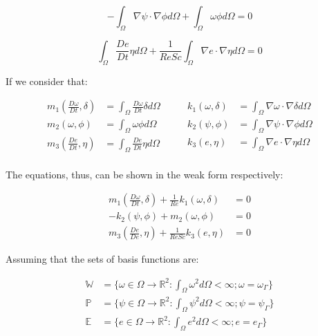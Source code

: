 \begin{equation} \label{stream weak}
 - \int_{\Omega} \nabla \psi \cdot \nabla \phi d\Omega
 + \int_{\Omega} \omega \phi d\Omega = 0
\end{equation}

\begin{equation} \label{concentration weak} 
   \int_{\Omega} \frac{D e}{Dt} \eta d\Omega
 + \frac{1}{\textit{ReSc}} \int_{\Omega} \nabla e \cdot \nabla \eta d\Omega 
 = 0
\end{equation}


\medskip
\noindent
If we consider that:

\begin{equation}
 \begin{aligned}
  \textbf{$m_1$}(\frac{D \omega}{Dt},\delta) & = \int_{\Omega} \frac{D \omega}{Dt} \delta d\Omega \\ 
  \textbf{$m_2$}(\omega,\phi) & = \int_{\Omega} \omega \phi d\Omega \\
  \textbf{$m_3$}(\frac{De}{Dt},\eta) & = \int_{\Omega} \frac{De}{Dt} \eta d\Omega \\
 \end{aligned}
 \qquad
 \begin{aligned}  
  \textbf{$k_1$}(\omega,\delta) & = \int_{\Omega} \nabla \omega \cdot \nabla \delta d\Omega \\
  \textbf{$k_2$}(\psi,\phi) & = \int_{\Omega} \nabla \psi \cdot \nabla \phi d\Omega \\
  \textbf{$k_3$}(e,\eta) & = \int_{\Omega} \nabla e \cdot \nabla \eta d\Omega \\
 \end{aligned}
\end{equation}

\noindent
The equations, thus, can be shown in the weak form respectively:

\begin{align}
 \textbf{$m_1$}(\frac{D \omega}{Dt},\delta) 
 + \frac{1}{\textit{Re}}\textbf{$k_1$}(\omega,\delta) 
 & = 0 \\
 - \textbf{$k_2$}(\psi,\phi) 
 + \textbf{$m_2$}(\omega,\phi) 
 & = 0 \\
 \textbf{$m_3$}(\frac{De}{De},\eta) 
 + \frac{1}{\textit{ReSc}}\textbf{$k_3$}(e,\eta) 
 & = 0
\end{align}


\noindent
Assuming that the sets of basis functions are:

\begin{equation}
 \begin{aligned}
  \mathbb{W} &= \{\omega \in \Omega \rightarrow \mathbb{R}^2
  : \int_\Omega \omega^2 d\Omega < \infty 
  ; \omega = \omega_\Gamma\} \\
  \mathbb{P} &= \{\psi \in \Omega \rightarrow \mathbb{R}^2
  : \int_\Omega \psi^2 d\Omega < \infty 
  ; \psi = \psi_\Gamma\} \\
  \mathbb{E} &= \{e \in \Omega \rightarrow \mathbb{R}^2
  : \int_\Omega e^2 d\Omega < \infty 
  ; e = e_\Gamma\}
 \end{aligned}
\end{equation}

